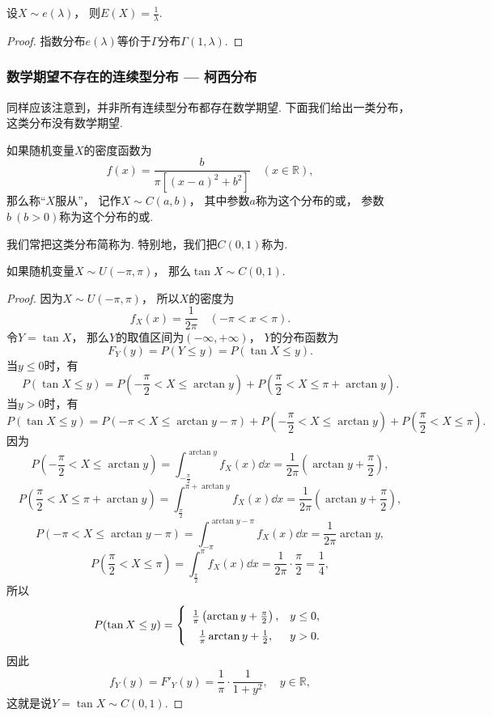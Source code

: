 \begin{theorem}\label{theorem:随机变量的数字特征.指数分布的数学期望}
设\(X \sim e(\lambda)\)，
则\(E(X) = \frac1\lambda\).
\begin{proof}
指数分布\(e(\lambda)\)等价于\(\Gamma\)分布\(\Gamma(1,\lambda)\).
\end{proof}
\end{theorem}

\subsubsection{数学期望不存在的连续型分布 --- 柯西分布}
同样应该注意到，并非所有连续型分布都存在数学期望.
下面我们给出一类分布，这类分布没有数学期望.

\begin{definition}
如果随机变量\(X\)的密度函数为\[
	f(x) = \frac{b}{\pi[(x-a)^2+b^2]}
	\quad(x\in\mathbb{R}),
\]
那么称“\(X\)服从”，
记作\(X \sim C(a,b)\)，
其中参数\(a\)称为这个分布的或，
参数\(b\ (b>0)\)称为这个分布的或.

我们常把这类分布简称为.
特别地，我们把\(C(0,1)\)称为.
\end{definition}

\begin{proposition}
如果随机变量\(X \sim U(-\pi,\pi)\)，
那么\(\tan X \sim C(0,1)\).
\begin{proof}
因为\(X \sim U(-\pi,\pi)\)，
所以\(X\)的密度为\[
	f_X(x) = \frac{1}{2\pi}
	\quad(-\pi<x<\pi).
\]
令\(Y = \tan X\)，
那么\(Y\)的取值区间为\((-\infty,+\infty)\)，
\(Y\)的分布函数为\[
	F_Y(y)
	= P(Y \leq y)
	= P(\tan X \leq y).
\]
当\(y\leq0\)时，有\[
	P(\tan X \leq y)
	= P\left(-\frac\pi2 < X \leq \arctan y\right)
	+ P\left(\frac\pi2 < X \leq \pi + \arctan y\right).
\]
当\(y>0\)时，有\[
	P(\tan X \leq y)
	= P\left(-\pi < X \leq \arctan y - \pi\right)
	+ P\left(-\frac\pi2 < X \leq \arctan y\right)
	+ P\left(\frac\pi2 < X \leq \pi\right).
\]
因为\[
	P\left(-\frac\pi2 < X \leq \arctan y\right)
	= \int_{-\frac\pi2}^{\arctan y} f_X(x) \dd{x}
	= \frac{1}{2\pi} \left(\arctan y + \frac\pi2\right),
\]\[
	P\left(\frac\pi2 < X \leq \pi + \arctan y\right)
	= \int_{\frac\pi2}^{\pi + \arctan y} f_X(x) \dd{x}
	= \frac{1}{2\pi} \left(\arctan y + \frac\pi2\right),
\]\[
	P\left(-\pi < X \leq \arctan y - \pi\right)
	= \int_{-\pi}^{\arctan y - \pi} f_X(x) \dd{x}
	= \frac{1}{2\pi} \arctan y,
\]\[
	P\left(\frac\pi2 < X \leq \pi\right)
	= \int_{\frac\pi2}^\pi f_X(x) \dd{x}
	= \frac{1}{2\pi} \cdot \frac\pi2
	= \frac14,
\]
所以\[
	P(\tan X \leq y)
	= \left\{ \def\arraystretch{1.5} \begin{array}{cl}
		\frac1\pi \left(\arctan y + \frac\pi2\right), & y\leq0, \\
		\frac1\pi \arctan y + \frac12, & y>0.
	\end{array} \right.
\]
因此\[
	f_Y(y) = F'_Y(y)
	= \frac1\pi \cdot \frac{1}{1+y^2},
	\quad y\in\mathbb{R},
\]
这就是说\(Y = \tan X \sim C(0,1)\).
\end{proof}
\end{proposition}


